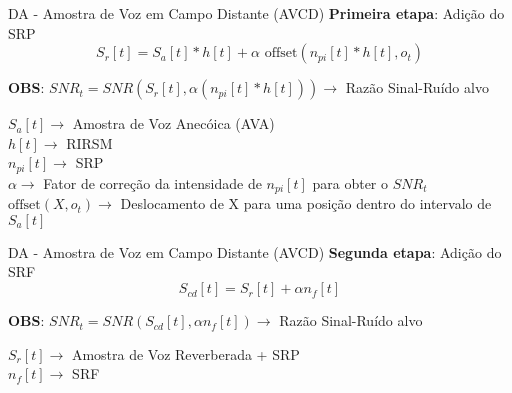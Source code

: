 \begin{frame}{DA - Amostra de Voz em Campo Distante (AVCD)}
    \textbf{Primeira etapa}: Adição do SRP \\
    \begin{equation*}
        S_r[t] =  S_a[t] \ast h[t] + \alpha \text{ offset}(n_{pi}[t] \ast h[t], o_t)    
    \end{equation*}
    \vspace{0.5cm}

    \textbf{OBS}: $SNR_t = SNR(S_r[t], \alpha (n_{pi}[t] \ast h[t])) \rightarrow$ Razão Sinal-Ruído alvo
    \vspace{0.5cm}

    $S_a[t] \rightarrow$ Amostra de Voz Anecóica (AVA) \\
    $h[t] \rightarrow$ RIRSM \\ 
    $n_{pi}[t] \rightarrow$ SRP \\ 
    $\alpha \rightarrow$ Fator de correção da intensidade de $n_{pi}[t]$ para obter o $SNR_t$ \\
    $\text{offset}(X, o_t) \rightarrow$ Deslocamento de X para uma posição dentro do intervalo de $S_a[t]$ \\
\end{frame}

\begin{frame}{DA - Amostra de Voz em Campo Distante (AVCD)}
    \textbf{Segunda etapa}: Adição do SRF \\
    \begin{equation*}
        S_{cd}[t] =  S_r[t] + \alpha n_f[t]
    \end{equation*}
    \vspace{0.5cm}

    \textbf{OBS}: $SNR_t = SNR(S_{cd}[t], \alpha n_f[t]) \rightarrow$ Razão Sinal-Ruído alvo
    \vspace{0.5cm}

    $S_r[t] \rightarrow$ Amostra de Voz Reverberada + SRP \\
    $n_f[t] \rightarrow$ SRF \\ 
\end{frame}

